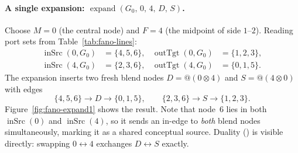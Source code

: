 \documentclass[11pt, a4paper]{article}
\theoremstyle{definition}
\theoremstyle{plain}
\theoremstyle{remark}
\newcommand{\inSrc}{\operatorname{inSrc}}
\newcommand{\outTgt}{\operatorname{outTgt}}
\newcommand{\expand}{\operatorname{expand}}
\begin{document}
\paragraph{A single expansion: $\expand(G_0,\,0,\,4,\,D,\,S)$.}
Choose $M = 0$ (the central node) and $F = 4$ (the midpoint of side $1$--$2$).
Reading port sets from Table~\ref{tab:fano-lines}:
\begin{align*}
  \inSrc(0,G_0)  &= \{4,5,6\}, & \outTgt(0,G_0) &= \{1,2,3\},\\
  \inSrc(4,G_0)  &= \{2,3,6\}, & \outTgt(4,G_0) &= \{0,1,5\}.
\end{align*}
The expansion inserts two fresh blend nodes $D = {@}(0{\otimes}4)$ and
$S = {@}(4{\otimes}0)$ with edges
\[
  \{4,5,6\}\to D\to\{0,1,5\},
  \qquad
  \{2,3,6\}\to S\to\{1,2,3\}.
\]
Figure~\ref{fig:fano-expand1} shows the result.  Note that node~$6$ lies in
both $\inSrc(0)$ and $\inSrc(4)$, so it sends an in-edge to \emph{both} blend
nodes simultaneously, marking it as a shared conceptual source.  Duality
() is visible directly: swapping $0 \leftrightarrow 4$
exchanges $D \leftrightarrow S$ exactly.
\end{document}
